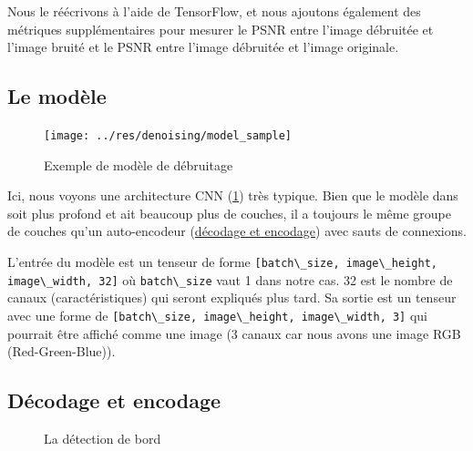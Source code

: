 \documentclass[
  12pt,
  dvipsnames]{article}
\newcommand{\passthrough}[1]{#1}
\begin{document}
Nous le réécrivons à l'aide de TensorFlow, et nous ajoutons également des métriques supplémentaires pour mesurer le PSNR entre l'image débruitée et l'image bruité et le PSNR entre l'image débruitée et l'image originale.

\hypertarget{le-moduxe8le}{%
\subsection{Le modèle}\label{le-moduxe8le}}

\begin{figure}

{\centering \texttt{[image: ../res/denoising/model\_sample]} 

}

\caption{Exemple de modèle de débruitage}\label{fig:denoising-model}
\end{figure}

Ici, nous voyons une architecture CNN (\ref{fig:denoising-model}) très typique. Bien que le modèle dans \autocite{1711.10925} soit plus profond et ait beaucoup plus de couches, il a toujours le même groupe de couches qu'un auto-encodeur (\protect\hyperlink{duxe9codage-et-encodage}{décodage et encodage}) avec sauts de connexions.

L'entrée du modèle est un tenseur de forme \passthrough{\lstinline![batch\_size, image\_height, image\_width, 32]!} où \passthrough{\lstinline!batch\_size!} vaut 1 dans notre cas. 32 est le nombre de canaux (caractéristiques) qui seront expliqués plus tard. Sa sortie est un tenseur avec une forme de \passthrough{\lstinline![batch\_size, image\_height, image\_width, 3]!} qui pourrait être affiché comme une image (3 canaux car nous avons une image RGB (Red-Green-Blue)).

\hypertarget{duxe9codage-et-encodage}{%
\subsection{Décodage et encodage}\label{duxe9codage-et-encodage}}

\begin{figure}

{\centering {}

}

\caption{La détection de bord}\label{fig:compare-with-edge}
\end{figure}
\end{document}
